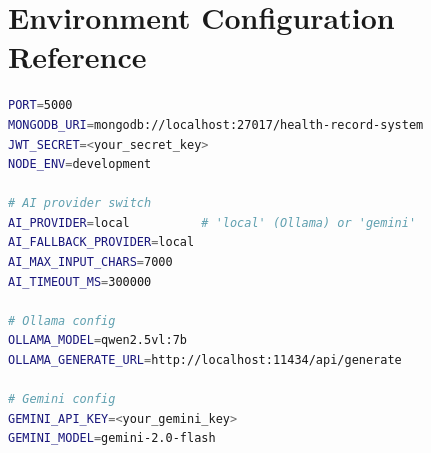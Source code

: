 \documentclass[12pt,a4paper]{report}
\begin{document}
\section{Environment Configuration Reference}

\begin{lstlisting}[language=bash, caption=Backend .env Configuration Variables]
PORT=5000
MONGODB_URI=mongodb://localhost:27017/health-record-system
JWT_SECRET=<your_secret_key>
NODE_ENV=development

# AI provider switch
AI_PROVIDER=local          # 'local' (Ollama) or 'gemini'
AI_FALLBACK_PROVIDER=local
AI_MAX_INPUT_CHARS=7000
AI_TIMEOUT_MS=300000

# Ollama config
OLLAMA_MODEL=qwen2.5vl:7b
OLLAMA_GENERATE_URL=http://localhost:11434/api/generate

# Gemini config
GEMINI_API_KEY=<your_gemini_key>
GEMINI_MODEL=gemini-2.0-flash
\end{lstlisting}
\end{document}
